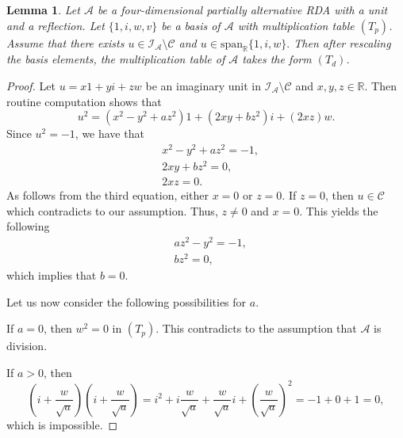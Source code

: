 \documentclass{amsart}
\theoremstyle{definition}
\theoremstyle{plain}
\newtheorem{lemma}{Lemma}
\begin{document}
\begin{lemma}
Let $\mathcal A$ be a four-dimensional partially alternative RDA with a unit and a reflection. Let $\{1, i, w, v\}$ be a basis of $\mathcal A$ with multiplication table $(T_p)$.   Assume that there exists $u\in \mathcal{I}_\mathcal{A}\setminus \mathcal C$ and $u\in \text{span}_{\mathbb R}\{1, i, w\}.$
Then after rescaling the basis elements, the multiplication table of  $\mathcal A$  takes the form  $(T_d)$.
\end{lemma}
\begin{proof}
Let $u=x1 + yi +zw$ be an imaginary unit in $\mathcal{I}_\mathcal{A}\setminus \mathcal C$ and $x, y, z \in \mathbb R$. Then routine computation shows that 
$$u^2 =  (x^2 - y^2 + az^2) 1 + (2xy + bz^2) i + (2xz) w.$$
Since $u^2=-1$, we have that 
\begin{align*}
& x^2 - y^2 + az^2 = -1,\\
& 2xy + bz^2 = 0,\\
& 2xz = 0. 
\end{align*}
As follows from the third equation, either $x=0$ or $z=0$. If $z=0$, then $u \in \mathcal C$ which contradicts to our assumption.  
Thus, $z\neq 0$ and $x=0$. This yields the following 
\begin{align*}
& a z^2-y^2  = -1,\\
& bz^2 = 0,
\end{align*}
which implies that $b=0$.

Let us now consider the following possibilities for $a$.

If $a=0$, then $w^2=0$ in $(T_p)$. This contradicts to the assumption that $\mathcal A$ is division. 

If $a>0$, then $$\left( i+\dfrac{w}{\sqrt{a}}\right) \left( i+\dfrac{w}{\sqrt{a}}\right) = i^2 + i \dfrac{w}{\sqrt{a}} +  \dfrac{w}{\sqrt{a}} i +  \left(\dfrac{w}{\sqrt{a}} \right)^2 = -1+ 0 +1 =0, $$   
which is impossible.


\end{proof}
\end{document}
